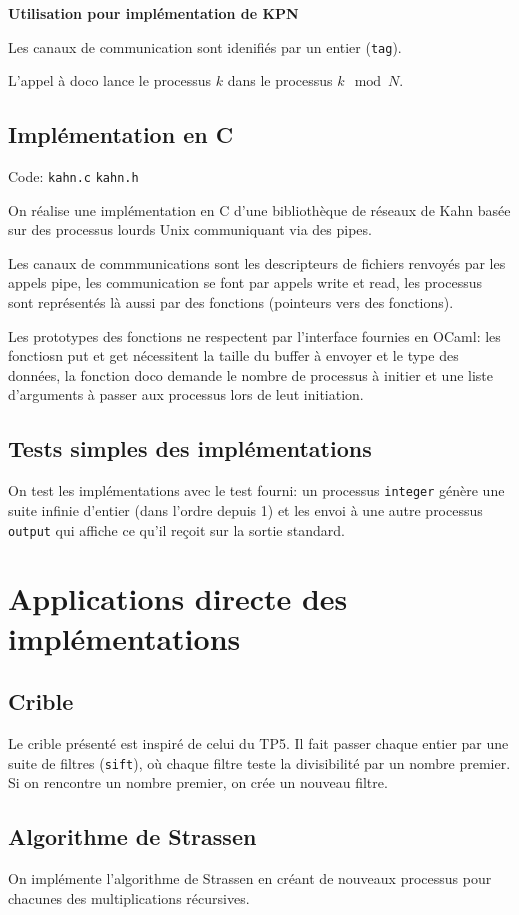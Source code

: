 \documentclass[a4paper]{article}
\begin{document}
\textbf{Utilisation pour implémentation de KPN}

Les canaux de communication sont idenifiés par un entier (\verb|tag|).

L'appel à doco lance le processus $k$ dans le processus $k\mod{N}$.


\subsection{Implémentation en C}

Code: \verb|kahn.c| \verb|kahn.h|

On réalise une implémentation en C d'une bibliothèque de réseaux de Kahn basée sur des processus lourds Unix communiquant via des pipes.

Les canaux de commmunications sont les descripteurs de fichiers renvoyés par les appels pipe, les communication se font par appels write et read, les processus sont représentés là aussi par des fonctions (pointeurs vers des fonctions).

Les prototypes des fonctions ne respectent par l'interface fournies en OCaml: les fonctiosn put et get nécessitent la taille du buffer à envoyer et le type des données, la fonction doco demande le nombre de processus à initier et une liste d'arguments à passer aux processus lors de leut initiation.

\subsection{Tests simples des implémentations}

On test les implémentations avec le test fourni: un processus \verb|integer| génère une suite infinie d'entier (dans l'ordre depuis 1) et les envoi à une autre processus \verb|output| qui affiche ce qu'il reçoit sur la sortie standard.

\section{Applications directe des implémentations}
\subsection{Crible}
Le crible présenté est inspiré de celui du TP5. Il fait passer chaque entier par une suite de filtres (\texttt{sift}), où chaque filtre teste la divisibilité par un nombre premier. Si on rencontre un nombre premier, on crée un nouveau filtre.
\subsection{Algorithme de Strassen}
On implémente l'algorithme de Strassen en créant de nouveaux processus pour chacunes des multiplications récursives.
\end{document}
